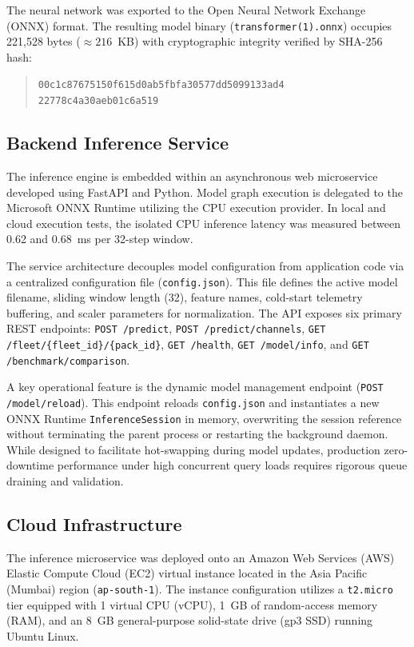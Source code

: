 \documentclass[conference]{IEEEtran}
\begin{document}
The neural network was exported to the Open Neural Network Exchange (ONNX) format. The resulting model binary (\texttt{transformer(1).onnx}) occupies 221,528 bytes ($\approx 216$~KB) with cryptographic integrity verified by SHA-256 hash:
\begin{quote}
\footnotesize\texttt{00c1c87675150f615d0ab5fbfa30577dd5099133ad4\\22778c4a30aeb01c6a519}
\end{quote}

\subsection{Backend Inference Service}
The inference engine is embedded within an asynchronous web microservice developed using FastAPI and Python. Model graph execution is delegated to the Microsoft ONNX Runtime utilizing the CPU execution provider. In local and cloud execution tests, the isolated CPU inference latency was measured between 0.62 and 0.68~ms per 32-step window.

The service architecture decouples model configuration from application code via a centralized configuration file (\texttt{config.json}). This file defines the active model filename, sliding window length (32), feature names, cold-start telemetry buffering, and scaler parameters for normalization. The API exposes six primary REST endpoints: \texttt{POST /predict}, \texttt{POST /predict/channels}, \texttt{GET /fleet/\{fleet\_id\}/\{pack\_id\}}, \texttt{GET /health}, \texttt{GET /model/info}, and \texttt{GET /benchmark/comparison}.

A key operational feature is the dynamic model management endpoint (\texttt{POST /model/reload}). This endpoint reloads \texttt{config.json} and instantiates a new ONNX Runtime \texttt{InferenceSession} in memory, overwriting the session reference without terminating the parent process or restarting the background daemon. While designed to facilitate hot-swapping during model updates, production zero-downtime performance under high concurrent query loads requires rigorous queue draining and validation.

\subsection{Cloud Infrastructure}
The inference microservice was deployed onto an Amazon Web Services (AWS) Elastic Compute Cloud (EC2) virtual instance located in the Asia Pacific (Mumbai) region (\texttt{ap-south-1}). The instance configuration utilizes a \texttt{t2.micro} tier equipped with 1 virtual CPU (vCPU), 1~GB of random-access memory (RAM), and an 8~GB general-purpose solid-state drive (gp3 SSD) running Ubuntu Linux.
\end{document}
